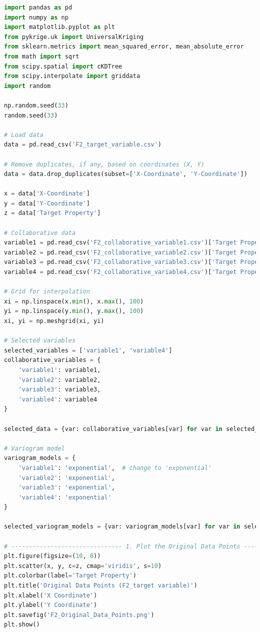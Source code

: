 \documentclass{swmcmthesis}
\begin{document}
\begin{lstlisting}[language=python,caption={The python programme for Problem 4}]
import pandas as pd
import numpy as np
import matplotlib.pyplot as plt
from pykrige.uk import UniversalKriging
from sklearn.metrics import mean_squared_error, mean_absolute_error
from math import sqrt
from scipy.spatial import cKDTree
from scipy.interpolate import griddata
import random

np.random.seed(33)
random.seed(33)

# Load data
data = pd.read_csv('F2_target_variable.csv')

# Remove duplicates, if any, based on coordinates (X, Y)
data = data.drop_duplicates(subset=['X-Coordinate', 'Y-Coordinate'])

x = data['X-Coordinate']
y = data['Y-Coordinate']
z = data['Target Property']

# Collaborative data
variable1 = pd.read_csv('F2_collaborative_variable1.csv')['Target Property']
variable2 = pd.read_csv('F2_collaborative_variable2.csv')['Target Property']
variable3 = pd.read_csv('F2_collaborative_variable3.csv')['Target Property']
variable4 = pd.read_csv('F2_collaborative_variable4.csv')['Target Property']

# Grid for interpolation
xi = np.linspace(x.min(), x.max(), 100)
yi = np.linspace(y.min(), y.max(), 100)
xi, yi = np.meshgrid(xi, yi)

# Selected variables
selected_variables = ['variable1', 'variable4']
collaborative_variables = {
    'variable1': variable1,
    'variable2': variable2,
    'variable3': variable3,
    'variable4': variable4
}

selected_data = {var: collaborative_variables[var] for var in selected_variables}

# Variogram model
variogram_models = {
    'variable1': 'exponential',  # change to 'exponential'
    'variable2': 'exponential',
    'variable3': 'exponential',
    'variable4': 'exponential'
}

selected_variogram_models = {var: variogram_models[var] for var in selected_variables}

# ------------------------------- 1. Plot the Original Data Points ------------------------------- #
plt.figure(figsize=(10, 8))
plt.scatter(x, y, c=z, cmap='viridis', s=10)
plt.colorbar(label='Target Property')  
plt.title('Original Data Points (F2_target variable)')
plt.xlabel('X Coordinate')
plt.ylabel('Y Coordinate')
plt.savefig('F2_Original_Data_Points.png')
plt.show()


\end{lstlisting}
\end{document}
